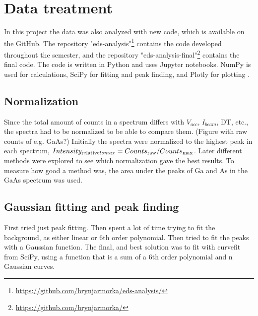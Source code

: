 %
%
\section{Data treatment}
\label{sec:method:treatment}
In this project the data was also analyzed with new code, which is available on the GitHub.
The repository "eds-analysis"\footnote{\url{https://github.com/brynjarmorka/eds-analysis/}} contains the code developed throughout the semester, and the repository "eds-analysis-final"\footnote{\url{https://github.com/brynjarmorka/}} contains the final code.
The code is written in Python and uses Jupyter notebooks.
NumPy is used for calculations, SciPy for fitting and peak finding, and Plotly for plotting .

\subsection{Normalization}
\label{sec:method:treatment:normalization}
Since the total amount of counts in a spectrum differs with $V_{acc}$, $I_{beam}$, DT, etc., the spectra had to be normalized to be able to compare them.
(Figure with raw counts of e.g. GaAs?)
Initially the spectra were normalized to the highest peak in each spectrum, $Intensity_{\textnormal{relative} to max} = Counts_{\textnormal{raw}} / Counts_{\textnormal{max}}$.
Later different methods were explored to see which normalization gave the best results.
To measure how good a method was, the area under the peaks of Ga and As in the GaAs spectrum was used.



\subsection{Gaussian fitting and peak finding}
\label{sec:method:treatment:fitting}
First tried just peak fitting.
Then spent a lot of time trying to fit the background, as either linear or 6th order polynomial.
Then tried to fit the peaks with a Gaussian function.
The final, and best  solution was to fit with curvefit from SciPy, using a function that is a sum of a 6th order polynomial and n Gaussian curves.


